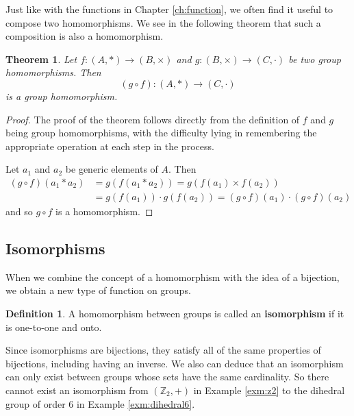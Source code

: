 \documentclass[
]{book}
\newtheorem{theorem}{Theorem}[chapter]
\theoremstyle{definition}
\newtheorem{definition}{Definition}[chapter]
\theoremstyle{definition}
\theoremstyle{definition}
\theoremstyle{remark}
\begin{document}
Just like with the functions in Chapter \ref{ch:function}, we often find it useful to compose two homomorphisms. We see in the following theorem that such a composition is also a homomorphism.

\begin{theorem}
\protect\hypertarget{thm:homomorphism-composition}{}{\label{thm:homomorphism-composition} }Let \(f: (A,*) \rightarrow (B,\times)\) and \(g:(B,\times) \rightarrow (C,\cdot)\) be two group homomorphisms. Then \[(g\circ f): (A,*) \rightarrow (C,\cdot)\] is a group homomorphism.
\end{theorem}

\begin{proof}
{}The proof of the theorem follows directly from the definition of \(f\) and \(g\) being group homomorphisms, with the difficulty lying in remembering the appropriate operation at each step in the process.

Let \(a_1\) and \(a_2\) be generic elements of \(A\). Then
\begin{align*}
(g\circ f)(a_1 * a_2) &= g \left( f(a_1*a_2)\right) = g\left( f(a_1)\times f(a_2)\right) \\
&= g(f(a_1)) \cdot g(f(a_2)) = (g\circ f)(a_1) \cdot (g\circ f)(a_2)
\end{align*}
and so \(g\circ f\) is a homomorphism.
\end{proof}

\hypertarget{isomorphisms}{%
\subsection{Isomorphisms}\label{isomorphisms}}

When we combine the concept of a homomorphism with the idea of a bijection, we obtain a new type of function on groups.

\begin{definition}
\protect\hypertarget{def:unnamed-chunk-163}{}{\label{def:unnamed-chunk-163} }A homomorphism between groups is called an \textbf{isomorphism} if it is one-to-one and onto.
\end{definition}

Since isomorphisms are bijections, they satisfy all of the same properties of bijections, including having an inverse. We also can deduce that an isomorphism can only exist between groups whose sets have the same cardinality. So there cannot exist an isomorphism from \((\mathbb{Z}_2,+)\) in Example \ref{exm:z2} to the dihedral group of order 6 in Example \ref{exm:dihedral6}.
\end{document}
